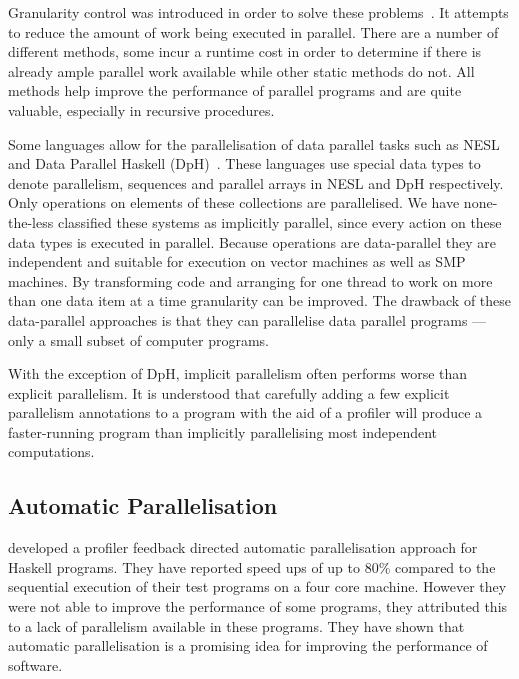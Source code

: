 Granularity control was introduced in order to solve these
problems~\citep{lopez96:distance_granularity,shen_98_granularity-control}.
It attempts to reduce the amount of work being executed in parallel.
There are a number of different methods, some incur a
runtime cost in order to determine if there is already ample parallel
work available while other static methods do not.
All methods help improve the performance of parallel programs and are
quite valuable, especially in recursive procedures.

Some languages allow for the parallelisation of data parallel
tasks such as NESL~\citep{blelloch:95:nesl} and Data Parallel
Haskell (DpH)~\citep{dph:2007:status_report,dph:2008:harnessing_the_multicores}.
These languages use special data types to denote parallelism,
sequences and parallel arrays in NESL and DpH respectively.
Only operations on elements of these collections are parallelised.
We have none-the-less classified these systems as implicitly parallel,
since every action on these data types is executed in parallel.
Because operations are data-parallel they are independent and suitable
for execution on vector machines as well as SMP machines.
By transforming code and arranging for one thread to work on more than
one data item at a time granularity can be improved.
The drawback of these data-parallel approaches is that they can
parallelise data parallel programs
--- only a small subset of computer programs.

With the exception of DpH, implicit parallelism often performs worse
than explicit parallelism.
It is understood that carefully adding a few explicit parallelism annotations
to a program with the aid of a profiler will produce a faster-running
program than implicitly parallelising most independent computations.

\subsection{Automatic Parallelisation}
\label{sec:lit_automatic-parallelisation}

\citet{harris_07_feedback_imp_par} developed a profiler
feedback directed automatic parallelisation approach for Haskell programs.
They have reported speed ups of up to 80\% compared to the sequential
execution of their test programs on a four core machine.
However they were not able to improve the performance of some
programs, they attributed this to a lack of parallelism
available in these programs.
They have shown that automatic parallelisation is a promising idea for
improving the performance of software.

